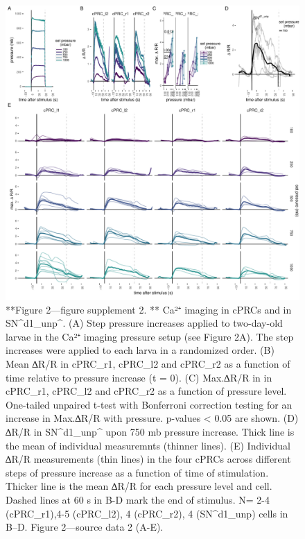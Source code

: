 \documentclass[
]{article}
\begin{document}
\begin{figure}
\includegraphics[width=55.56in]{Figures/Figure2-FigureSupplement2} \caption{**Figure 2—figure supplement 2. ** Ca²⁺ imaging in cPRCs and in SN^d1_unp^. (A) Step pressure increases applied to two-day-old larvae in the Ca²⁺ imaging pressure setup (see Figure 2A). The step increases were applied to each larva in a randomized order. (B) Mean ∆R/R in cPRC_r1, cPRC_l2 and cPRC_r2 as a function of time relative to pressure increase (t = 0). (C) Max.∆R/R in in cPRC_r1, cPRC_l2 and cPRC_r2 as a function of pressure level. One-tailed unpaired t-test with Bonferroni correction testing for an increase in Max.∆R/R with pressure. p-values < 0.05 are shown. (D) ∆R/R in SN^d1_unp^ upon 750 mb pressure increase. Thick line is the mean of individual measuremnts (thinner lines). (E) Individual ∆R/R measurements (thin lines) in the four cPRCs across different steps of pressure increase as a function of time of stimulation. Thicker line is the mean ∆R/R for each pressure level and cell. Dashed lines at 60 s in B-D mark the end of stimulus. N= 2-4 (cPRC_r1),4-5 (cPRC_l2), 4 (cPRC_r2), 4 (SN^d1_unp) cells in B–D. Figure 2---source data 2 (A-E). }\label{fig:unnamed-chunk-12}
\end{figure}
\end{document}

